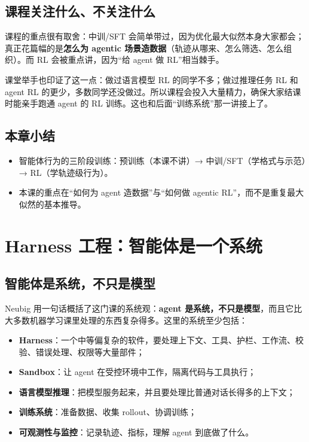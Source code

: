 \documentclass[a4paper]{article}
\begin{document}
\subsection{课程关注什么、不关注什么}

课程的重点很有取舍：中训/SFT 会简单带过，因为优化最大似然本身大家都会；真正花篇幅的是\textbf{怎么为 agentic 场景造数据}（轨迹从哪来、怎么筛选、怎么组织）。而 RL 会被重点讲，因为“给 agent 做 RL”相当棘手。

课堂举手也印证了这一点：做过语言模型 RL 的同学不多；做过推理任务 RL 和 agent RL 的更少，多数同学还没做过。所以课程会投入大量精力，确保大家结课时能亲手跑通 agent 的 RL 训练。这也和后面“训练系统”那一讲接上了。

\subsection{本章小结}

\begin{itemize}
\item 智能体行为的三阶段训练：预训练（本课不讲）→ 中训/SFT（学格式与示范）→ RL（学轨迹级行为）。
\item 本课的重点在“如何为 agent 造数据”与“如何做 agentic RL”，而不是重复最大似然的基本推导。
\end{itemize}

\section{Harness 工程：智能体是一个系统}

\subsection{智能体是系统，不只是模型}

Neubig 用一句话概括了这门课的系统观：\textbf{agent 是系统，不只是模型}，而且它比大多数机器学习课里处理的东西复杂得多。这里的系统至少包括：

\begin{itemize}
\item \textbf{Harness}：一个中等偏复杂的软件，要处理上下文、工具、护栏、工作流、校验、错误处理、权限等大量部件；
\item \textbf{Sandbox}：让 agent 在受控环境中工作，隔离代码与工具执行；
\item \textbf{语言模型推理}：把模型服务起来，并且要处理比普通对话长得多的上下文；
\item \textbf{训练系统}：准备数据、收集 rollout、协调训练；
\item \textbf{可观测性与监控}：记录轨迹、指标，理解 agent 到底做了什么。
\end{itemize}
\end{document}
